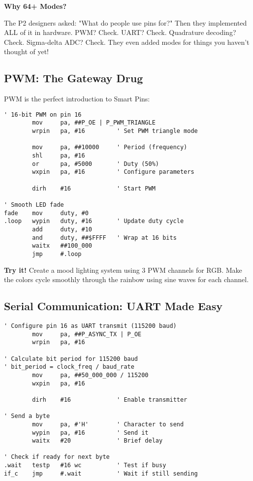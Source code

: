 \documentclass[11pt]{book}
\begin{document}
\begin{sidetrack}
\textbf{Why 64+ Modes?}

The P2 designers asked: "What do people use pins for?" Then they implemented ALL of it in hardware. PWM? Check. UART? Check. Quadrature decoding? Check. Sigma-delta ADC? Check. They even added modes for things you haven't thought of yet!
\end{sidetrack}

\hypertarget{pwm-the-gateway-drug}{%
\subsection{PWM: The Gateway Drug}\label{pwm-the-gateway-drug}}

PWM is the perfect introduction to Smart Pins:

\begin{lstlisting}
' 16-bit PWM on pin 16
        mov     pa, ##P_OE | P_PWM_TRIANGLE
        wrpin   pa, #16         ' Set PWM triangle mode
        
        mov     pa, ##10000     ' Period (frequency)
        shl     pa, #16
        or      pa, #5000       ' Duty (50%)
        wxpin   pa, #16         ' Configure parameters
        
        dirh    #16             ' Start PWM
        
' Smooth LED fade
fade    mov     duty, #0
.loop   wypin   duty, #16       ' Update duty cycle
        add     duty, #10
        and     duty, ##$FFFF   ' Wrap at 16 bits
        waitx   ##100_000
        jmp     #.loop
\end{lstlisting}

\textbf{Try it!} Create a mood lighting system using 3 PWM channels for
RGB. Make the colors cycle smoothly through the rainbow using sine waves
for each channel.

\hypertarget{serial-communication-uart-made-easy}{%
\subsection{Serial Communication: UART Made
Easy}\label{serial-communication-uart-made-easy}}

\begin{lstlisting}
' Configure pin 16 as UART transmit (115200 baud)
        mov     pa, ##P_ASYNC_TX | P_OE
        wrpin   pa, #16
        
' Calculate bit period for 115200 baud
' bit_period = clock_freq / baud_rate
        mov     pa, ##50_000_000 / 115200
        wxpin   pa, #16
        
        dirh    #16             ' Enable transmitter
        
' Send a byte
        mov     pa, #'H'        ' Character to send
        wypin   pa, #16         ' Send it
        waitx   #20             ' Brief delay
        
' Check if ready for next byte
.wait   testp   #16 wc          ' Test if busy
if_c    jmp     #.wait          ' Wait if still sending
\end{lstlisting}
\end{document}
